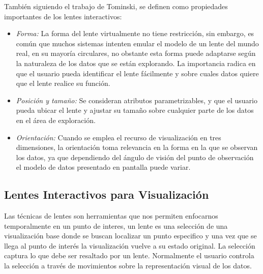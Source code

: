 \documentclass[journal]{IEEEtran}
\begin{document}
 También siguiendo el trabajo de Tominski, se definen como propiedades importantes de los lentes interactivos:
 \begin{itemize}
   \item  \emph{Forma:} La forma del lente virtualmente no tiene restricción, sin embargo, es común que muchos sistemas intenten
   emular el modelo de un lente del mundo real, en su mayoría circulares, no obstante esta forma puede adaptarse según la naturaleza de los datos
   que se están explorando. La importancia radica en que el usuario pueda identificar el lente fácilmente y sobre cuales datos quiere que el lente
   realice su función.
   \item \emph{Posición y tamaño:} Se consideran atributos parametrizables, y que el usuario pueda ubicar el lente y ajustar su tamaño sobre
   cualquier parte de los datos en el área de exploración.
   \item \emph{Orientación:} Cuando se emplea el recurso de visualización en tres dimensiones, la orientación toma relevancia en la forma en la que 
   se observan los datos, ya que dependiendo del ángulo de visión del punto de observación el modelo de datos presentado en pantalla puede variar.
 \end{itemize}

 \subsection{Lentes Interactivos para Visualización}
 Las técnicas de lentes son herramientas que nos permiten enfocarnos temporalmente en un punto de interes, un lente es una selección 
 de una visualización base donde se buscan localizar un punto especifico y una vez que se llega al punto de interés
 la visualización vuelve a su estado original. La selección captura lo que debe ser resaltado por un lente. 
 Normalmente el usuario controla la selección a través de movimientos sobre la representación visual de los datos. 
 
\end{document}
